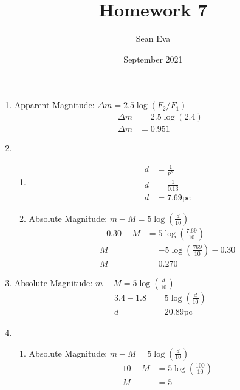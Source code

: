 \documentclass{article}
\title{Homework  7}
\author{Sean Eva}
\date{September 2021}
\begin{document}
\begin{enumerate}
    \item 
    
    Apparent Magnitude: $\Delta m = 2.5\log (F_2/F_1)$
    \begin{align*}
        \Delta m &= 2.5\log (2.4)\\
        \Delta m &= 0.951
    \end{align*}
    
    \item
    
    \begin{enumerate}
        \item 
        
        \begin{align*}
            d &= \frac{1}{p''}\\
            d &= \frac{1}{0.13}\\
            d &= 7.69 \text{pc}
        \end{align*}
        
        \item
        
        Absolute Magnitude: $m-M = 5\log(\frac{d}{10})$
        \begin{align*}
            -0.30-M &= 5\log(\frac{7.69}{10})\\
            M &= -5\log(\frac{7
            69}{10})-0.30\\
            M &= 0.270
        \end{align*}
        
    \end{enumerate}
    
    \item
    
    Absolute Magnitude: $m-M = 5\log(\frac{d}{10})$
    \begin{align*}
        3.4-1.8 &= 5\log(\frac{d}{10})\\
        d &= 20.89\text{pc}
    \end{align*}
    
    \item
    
    \begin{enumerate}
        \item 
        
        Absolute Magnitude: $m-M = 5\log(\frac{d}{10})$
        \begin{align*}
            10 - M &= 5\log(\frac{100}{10})\\
            M &= 5
        \end{align*}
        

\end{enumerate}
\end{enumerate}
\end{document}

